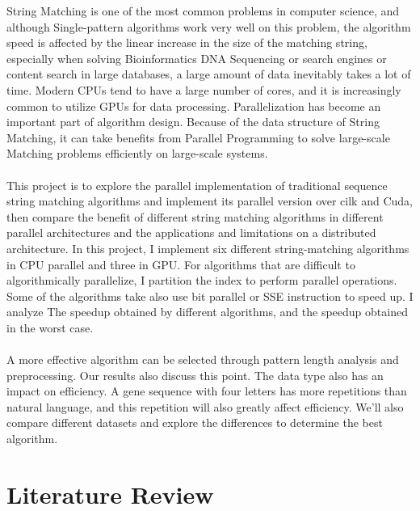 \documentclass[11pt]{article}       %
\begin{document}
String Matching is one of the most common problems in computer science, and although Single-pattern algorithms work very well on this problem, the algorithm speed is affected by the linear increase in the size of the matching string, especially when solving Bioinformatics DNA Sequencing or search engines or content search in large databases, a large amount of data inevitably takes a lot of time. Modern CPUs tend to have a large number of cores, and it is increasingly common to utilize GPUs for data processing. Parallelization has become an important part of algorithm design. Because of the data structure of String Matching, it can take benefits from Parallel Programming to solve large-scale Matching problems efficiently on large-scale systems.\\
\\This project is to explore the parallel implementation of traditional sequence string matching algorithms and implement its parallel version over cilk and Cuda, then compare the benefit of different string matching algorithms in different parallel architectures and the applications and limitations on a distributed architecture. In this project, I implement six different string-matching algorithms in CPU parallel and three in GPU. For algorithms that are difficult to algorithmically parallelize, I partition the index to perform parallel operations. Some of the algorithms take also use bit parallel or SSE instruction to speed up. I analyze The speedup obtained by different algorithms, and the speedup obtained in the worst case.\\ 
\\A more effective algorithm can be selected through pattern length analysis and preprocessing. Our results also discuss this point. The data type also has an impact on efficiency. A gene sequence with four letters has more repetitions than natural language, and this repetition will also greatly affect efficiency. We'll also compare different datasets and explore the differences to determine the best algorithm.\\





\section{Literature Review} \label{litrev}
\end{document}
